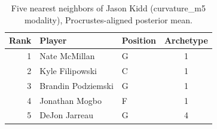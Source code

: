 \begin{table}[htbp]
  \centering\small
  \begin{tabular}{rllc}
    \toprule
    Rank & Player & Position & Archetype \\
    \midrule
    1 & Nate McMillan & G & 1 \\
    2 & Kyle Filipowski & C & 1 \\
    3 & Brandin Podziemski & G & 1 \\
    4 & Jonathan Mogbo & F & 1 \\
    5 & DeJon Jarreau & G & 4 \\
    \bottomrule
  \end{tabular}
  \caption{Five nearest neighbors of Jason Kidd (curvature_m5 modality), Procrustes-aligned posterior mean.}
  \label{tab:Jason_Kidd_neighbors_curvature_m5}
\end{table}

